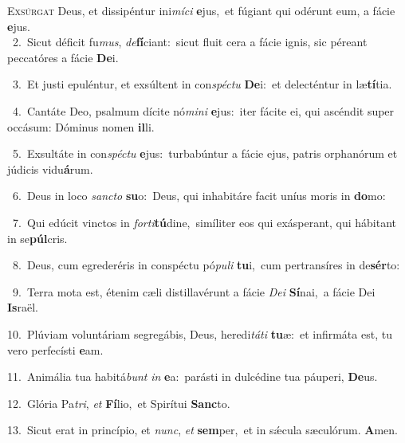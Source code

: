 \lettrine{\initial\textcolor{\initialcolor}{E}}{xsúrgat} Deus, et dissipéntur ini\-\textit{mí}\-\textit{ci} \textbf{e}\-jus,~\star et fúgiant qui odérunt eum, a fácie \textbf{e}\-jus.\\
{\numbfont\textcolor{\numbcolor}{~2.}}~Sicut déficit fu\-\textit{mus}\-, \textit{de}\-\textbf{fí}ciant:~\star sicut fluit cera a fácie ignis, sic péreant peccatóres a fácie \textbf{De}\-i.\par
{\numbfont\textcolor{\numbcolor}{~3.}}~Et justi epuléntur, et exsúltent in con\-\textit{spéc}\-\textit{tu} \textbf{De}\-i:~\star et delecténtur in læ\-\textbf{tí}\-tia.\par
{\numbfont\textcolor{\numbcolor}{~4.}}~Cantáte Deo, psalmum dícite nó\-\textit{mi}\-\textit{ni} \textbf{e}\-jus:~\star iter fácite ei, qui ascéndit super occásum: Dóminus nomen \textbf{il}\-li.\par
{\numbfont\textcolor{\numbcolor}{~5.}}~Exsultáte in con\-\textit{spéc}\-\textit{tu} \textbf{e}\-jus:~\star turbabúntur a fácie ejus, patris orphanórum et júdicis vidu\-\textbf{á}\-rum.\par
{\numbfont\textcolor{\numbcolor}{~6.}}~Deus in loco \textit{sanc}\-\textit{to} \textbf{su}\-o:~\star Deus, qui inhabitáre facit uníus moris in \textbf{do}\-mo:\par
{\numbfont\textcolor{\numbcolor}{~7.}}~Qui edúcit vinctos in \textit{for}\-\textit{ti}\textbf{tú}dine,~\star simíliter eos qui exásperant, qui hábitant in se\-\textbf{púl}\-cris.\par
{\numbfont\textcolor{\numbcolor}{~8.}}~Deus, cum egrederéris in conspéctu pó\-\textit{pu}\-\textit{li} \textbf{tu}\-i,~\star cum pertransíres in de\-\textbf{sér}\-to:\par
{\numbfont\textcolor{\numbcolor}{~9.}}~Terra mota est, étenim cæli distillavérunt a fácie \textit{De}\-\textit{i} \textbf{Sí}\-nai,~\star a fácie Dei \textbf{Is}\-raël.\par
{\numbfont\textcolor{\numbcolor}{10.}}~Plúviam voluntáriam segregábis, Deus, heredi\-\textit{tá}\-\textit{ti} \textbf{tu}\-æ:~\star et infirmáta est, tu vero perfecísti \textbf{e}\-am.\par
{\numbfont\textcolor{\numbcolor}{11.}}~Animália tua habitá\textit{bunt} \textit{in} \textbf{e}\-a:~\star parásti in dulcédine tua páuperi, \textbf{De}\-us.\par
{\numbfont\textcolor{\numbcolor}{12.}}~Glória Pa\-\textit{tri}\-, \textit{et} \textbf{Fí}\-lio,~\star et Spirítui \textbf{Sanc}\-to.\par
{\numbfont\textcolor{\numbcolor}{13.}}~Sicut erat in princípio, et \textit{nunc}\-, \textit{et} \textbf{sem}\-per,~\star et in sǽcula sæculórum. \textbf{A}\-men.\par
